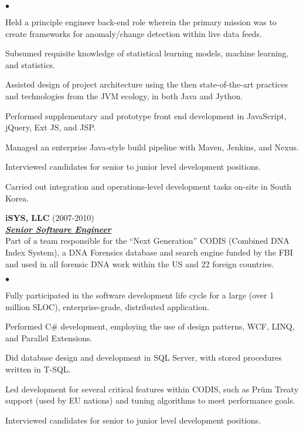 \documentclass{article}
\newcommand{\employer}[3]{{ \textbf{#1} (#2)\\ \underline{\textbf{\emph{#3}}}\\  }}
\newenvironment{achievements}{\begin{list}{$\bullet$}{\topsep 0pt \itemsep
      -2pt}}{\vspace*{4pt}\end{list}}
\begin{document}
\begin{achievements}
\item Held a principle engineer back-end role wherein the primary mission was
  to create frameworks for anomaly/change detection within live data feeds.
\item Subsumed requisite knowledge of statistical learning models, machine
  learning, and statistics.
\item Assisted design of project architecture using the then state-of-the-art
  practices and technologies from the JVM ecology, in both Java and Jython.
\item Performed supplementary and prototype front end development in
  JavaScript, jQuery, Ext JS, and JSP.
\item Managed an enterprise Java-style build pipeline with Maven, Jenkins, and
  Nexus.
\item Interviewed candidates for senior to junior level development positions.
\item Carried out integration and operations-level development tasks on-site in
  South Korea.
\end{achievements}

\employer{iSYS, LLC}{2007-2010}{Senior Software Engineer} Part of a team
responsible for the ``Next Generation'' CODIS (Combined DNA Index System), a
DNA Forensics database and search engine funded by the FBI and used in all
forensic DNA work within the US and 22 foreign countries.
\begin{achievements}
\item Fully participated in the software development life cycle for a large
  (over 1 million SLOC), enterprise-grade, distributed application.
\item Performed C\# development, employing the use of design patterns, WCF,
  LINQ, and Parallel Extensions.
\item Did database design and development in SQL Server, with stored procedures
  written in T-SQL.
\item Led development for several critical features within CODIS, such as
  Pr\"um Treaty support (used by EU nations) and tuning algorithms to meet
  performance goals.
\item Interviewed candidates for senior to junior level development positions.
\end{achievements}
\end{document}
